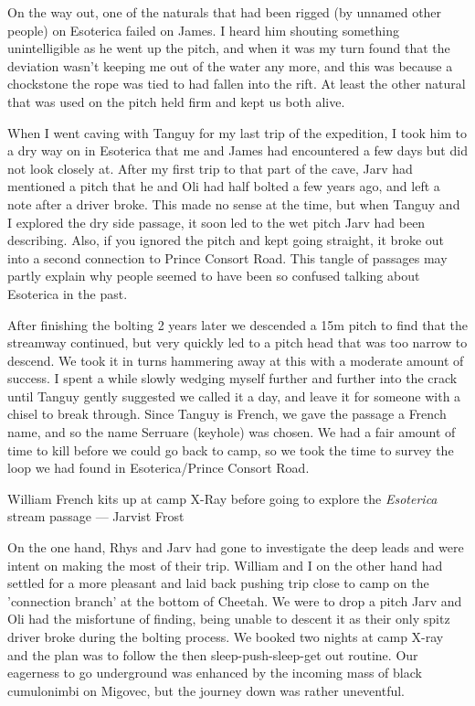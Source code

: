 On the way out, one of the naturals that had been rigged (by unnamed other people) on Esoterica failed on James. I heard him shouting something unintelligible as he went up the pitch, and when it was my turn found that the deviation wasn't keeping me out of the water any more, and this was because a chockstone the rope was tied to had fallen into the rift. At least the other natural that was used on the pitch held firm and kept us both alive.


When I went caving with Tanguy for my last trip of the expedition, I took him to a dry way on in Esoterica that me and James had encountered a few days but did not look closely at. After my first trip to that part of the cave, Jarv had mentioned a pitch that he and Oli had half bolted a few years ago, and left a note after a driver broke. This made no sense at the time, but when Tanguy and I explored the dry side passage, it soon led to the wet pitch Jarv had been describing. Also, if you ignored the pitch and kept going straight, it broke out into a second connection to Prince Consort Road. This tangle of passages may partly explain why people seemed to have been so confused talking about Esoterica in the past. 

After finishing the bolting 2 years later we descended a 15m pitch to find that the streamway continued, but very quickly led to a pitch head that was too narrow to descend. We took it in turns hammering away at this with a moderate amount of success. I spent a while slowly wedging myself further and further into the crack until Tanguy gently suggested we called it a day, and leave it for someone with a chisel to break through. Since Tanguy is French, we gave the passage a French name, and so the name Serruare (keyhole) was chosen. We had a fair amount of time to kill before we could go back to camp, so we took the time to survey the loop we had found in Esoterica/Prince Consort Road.

\begin{marginfigure}
\centering
{}
\label{Will at camp}
\caption{William French kits up at camp X-Ray before going to explore the \emph{Esoterica} stream passage --- Jarvist Frost}
\end{marginfigure}

On the one hand, Rhys and Jarv had gone to investigate the deep leads and were intent on making the most of their trip. William and I on the other hand had settled for a more pleasant and laid back pushing trip close to camp on the 'connection branch' at the bottom of Cheetah. We were to drop a pitch Jarv and Oli had the misfortune of finding, being unable to descent it as their only spitz driver broke during the bolting process. We booked two nights at camp X-ray and the plan was to follow the then sleep-push-sleep-get out routine. Our eagerness to go underground was enhanced by the incoming mass of black cumulonimbi on Migovec, but the journey down was rather uneventful.

